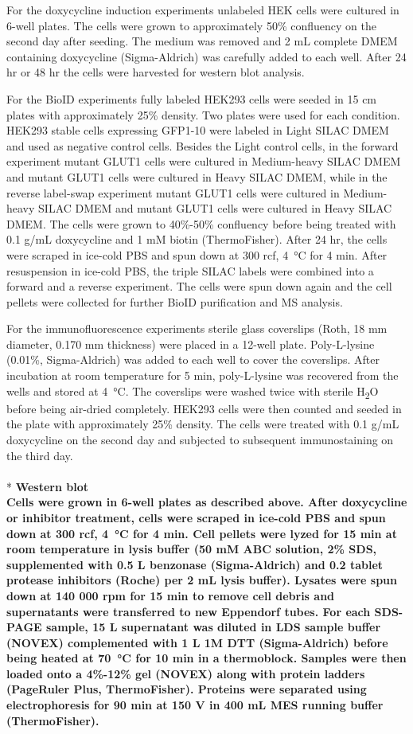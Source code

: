 For the doxycycline induction experiments unlabeled HEK cells were cultured in 6-well plates. The cells were grown to approximately 50\% confluency on the second day after seeding. The medium was removed and 2 mL complete DMEM containing doxycycline (Sigma-Aldrich) was carefully added to each well. After 24 hr or 48 hr the cells were harvested for western blot analysis.

For the BioID experiments fully labeled HEK293 cells were seeded in 15 cm plates with approximately 25\% density. Two plates were used for each condition. HEK293 stable cells expressing GFP1-10 were labeled in Light SILAC DMEM and used as negative control cells. Besides the Light control cells, in the forward experiment mutant GLUT1 cells were cultured in Medium-heavy SILAC DMEM and mutant GLUT1 cells were cultured in Heavy SILAC DMEM, while in the reverse label-swap experiment mutant GLUT1 cells were cultured in Medium-heavy SILAC DMEM and mutant GLUT1 cells were cultured in Heavy SILAC DMEM. The cells were grown to 40\%-50\% confluency before being treated with 0.1 {}\textmu g/mL doxycycline and 1 mM biotin (ThermoFisher). After 24 hr, the cells were scraped in ice-cold PBS and spun down at 300 rcf, \SI{4}{\celsius} for 4 min. After resuspension in ice-cold PBS, the triple SILAC labels were combined into a forward and a reverse experiment. The cells were spun down again and the cell pellets were collected for further BioID purification and MS analysis.

For the immunofluorescence experiments sterile glass coverslips (Roth, 18 mm diameter, 0.170 mm thickness) were placed in a 12-well plate. Poly-L-lysine (0.01\%, Sigma-Aldrich) was added to each well to cover the coverslips. After incubation at room temperature for 5 min, poly-L-lysine was recovered from the wells and stored at \SI{4}{\celsius}. The coverslips were washed twice with sterile H\textsubscript{2}O before being air-dried completely. HEK293 cells were then counted and seeded in the plate with approximately 25\% density. The cells were treated with 0.1 {}\textmu g/mL doxycycline on the second day and subjected to subsequent immunostaining on the third day.
\\
\\*
\bfseries{Western blot}\\
\normalfont Cells were grown in 6-well plates as described above. After doxycycline or inhibitor treatment, cells were scraped in ice-cold PBS and spun down at 300 rcf, \SI{4}{\celsius} for 4 min. Cell pellets were lyzed for 15 min at room temperature in lysis buffer (50 mM ABC solution, 2\% SDS, supplemented with 0.5 {}\textmu L benzonase (Sigma-Aldrich) and 0.2 tablet protease inhibitors (Roche) per 2 mL lysis buffer). Lysates were spun down at 140 000 rpm for 15 min to remove cell debris and supernatants were transferred to new Eppendorf tubes. For each SDS-PAGE sample, 15 {}\textmu L supernatant was diluted in LDS sample buffer (NOVEX) complemented with 1 {}\textmu L 1M DTT (Sigma-Aldrich) before being heated at \SI{70}{\celsius} for 10 min in a thermoblock. Samples were then loaded onto a 4\%-12\% gel (NOVEX) along with protein ladders (PageRuler Plus, ThermoFisher). Proteins were separated using electrophoresis for 90 min at 150 V in 400 mL MES running buffer (ThermoFisher). 

